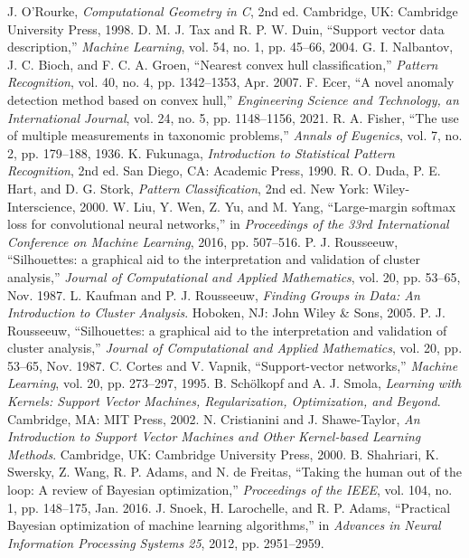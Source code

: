\documentclass[conference]{IEEEtran}
\begin{document}
\begin{thebibliography}{99}
 J. O'Rourke, \textit{Computational Geometry in C}, 2nd ed. Cambridge, UK: Cambridge University Press, 1998.
 D. M. J. Tax and R. P. W. Duin, “Support vector data description,” \textit{Machine Learning}, vol. 54, no. 1, pp. 45–66, 2004.
 G. I. Nalbantov, J. C. Bioch, and F. C. A. Groen, “Nearest convex hull classification,” \textit{Pattern Recognition}, vol. 40, no. 4, pp. 1342–1353, Apr. 2007.
 F. Ecer, “A novel anomaly detection method based on convex hull,” \textit{Engineering Science and Technology, an International Journal}, vol. 24, no. 5, pp. 1148–1156, 2021.
 R. A. Fisher, “The use of multiple measurements in taxonomic problems,” \textit{Annals of Eugenics}, vol. 7, no. 2, pp. 179–188, 1936.
 K. Fukunaga, \textit{Introduction to Statistical Pattern Recognition}, 2nd ed. San Diego, CA: Academic Press, 1990.
 R. O. Duda, P. E. Hart, and D. G. Stork, \textit{Pattern Classification}, 2nd ed. New York: Wiley-Interscience, 2000.
 W. Liu, Y. Wen, Z. Yu, and M. Yang, “Large-margin softmax loss for convolutional neural networks,” in \textit{Proceedings of the 33rd International Conference on Machine Learning}, 2016, pp. 507–516.
 P. J. Rousseeuw, “Silhouettes: a graphical aid to the interpretation and validation of cluster analysis,” \textit{Journal of Computational and Applied Mathematics}, vol. 20, pp. 53–65, Nov. 1987.
 L. Kaufman and P. J. Rousseeuw, \textit{Finding Groups in Data: An Introduction to Cluster Analysis}. Hoboken, NJ: John Wiley \& Sons, 2005.
 P. J. Rousseeuw, “Silhouettes: a graphical aid to the interpretation and validation of cluster analysis,” \textit{Journal of Computational and Applied Mathematics}, vol. 20, pp. 53–65, Nov. 1987.
 C. Cortes and V. Vapnik, “Support-vector networks,” \textit{Machine Learning}, vol. 20, pp. 273–297, 1995.
 B. Schölkopf and A. J. Smola, \textit{Learning with Kernels: Support Vector Machines, Regularization, Optimization, and Beyond}. Cambridge, MA: MIT Press, 2002.
 N. Cristianini and J. Shawe-Taylor, \textit{An Introduction to Support Vector Machines and Other Kernel-based Learning Methods}. Cambridge, UK: Cambridge University Press, 2000.
 B. Shahriari, K. Swersky, Z. Wang, R. P. Adams, and N. de Freitas, “Taking the human out of the loop: A review of Bayesian optimization,” \textit{Proceedings of the IEEE}, vol. 104, no. 1, pp. 148–175, Jan. 2016.
 J. Snoek, H. Larochelle, and R. P. Adams, “Practical Bayesian optimization of machine learning algorithms,” in \textit{Advances in Neural Information Processing Systems 25}, 2012, pp. 2951–2959.

\end{thebibliography}
\end{document}
